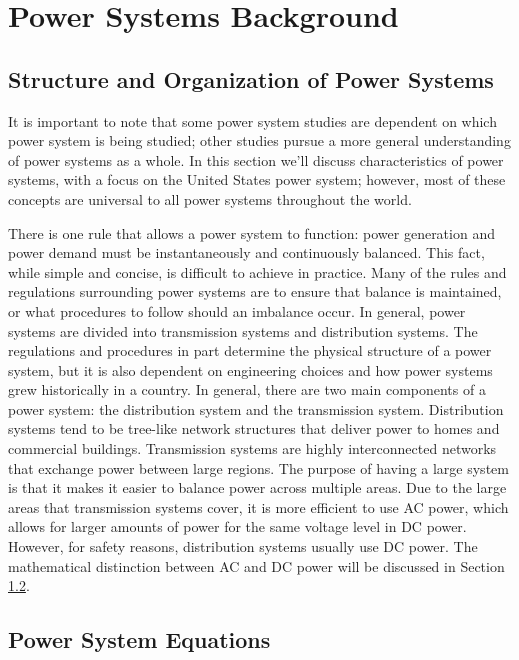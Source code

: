 \chapter{Power Systems Background}

\label{ch:background}

\section{Structure and Organization of Power Systems}


  It is important to note that some power system studies are dependent on which power system is being studied; other studies pursue a more general understanding of power systems as a whole.  In this section we'll discuss characteristics of power systems, with a focus on the United States power system; however, most of these concepts are universal to all power systems throughout the world.

There is one rule that allows a power system to function: power generation and power demand must be instantaneously and continuously balanced.  This fact, while simple and concise, is difficult to achieve in practice.  Many of the rules and regulations surrounding power systems are to ensure that balance is maintained, or what procedures to follow should an imbalance occur.  In general, power systems are divided into transmission systems and distribution systems.  The regulations and procedures in part determine the physical structure of a power system, but it is also dependent on engineering choices and how power systems grew historically in a country.  In general, there are two main components of a power system: the distribution system and the transmission system.  Distribution systems tend to be tree-like network structures that deliver power to homes and commercial buildings.  Transmission systems are highly interconnected networks that exchange power between large regions.  The purpose of having a large system is that it makes it easier to balance power across multiple areas.  Due to the large areas that transmission systems cover, it is more efficient to use AC power, which allows for larger amounts of power for the same voltage level in DC power.  However, for safety reasons, distribution systems usually use DC power.  The mathematical distinction between AC and DC power will be discussed in Section \ref{ps:power}.  

\section{Power System Equations}
\label{ps:power}


